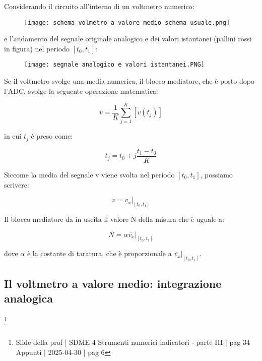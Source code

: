 Considerando il circuito all'interno di un voltmetro numerico: 

\begin{figure}[h]
    \centering
    \texttt{[image: schema volmetro a valore medio schema usuale.png]}
\end{figure} 

e l'andamento del segnale originale analogico e dei valori istantanei (pallini rossi in figura) nel periodo $[t_0, t_1]$: 

\begin{figure}[h]
    \centering
    \texttt{[image: segnale analogico e valori istantanei.PNG]}
\end{figure}

Se il voltmetro svolge una media numerica, il blocco mediatore, che è posto dopo l'ADC, 
svolge la seguente operazione matematica: 

{
    \Large 
    \begin{equation}
            \overline{v} = \frac{1}{K} \sum_{j = 1}^{K} \left[ v(t_j) \right]
    \end{equation}
}

in cui $t_j$ è preso come: 

{
    \Large 
    \begin{equation}
        t_j = t_0 + j \frac{t_1 - t_0}{K}
    \end{equation}
}

Siccome la media del segnale v viene svolta nel periodo $[t_0, t_1]$, 
possiamo scrivere: 

{
    \Large 
    \begin{equation}
        \overline{v} = \left. \overline{v_x} \right|_{[t_0, t_1]}
    \end{equation}
}

Il blocco mediatore da in uscita il valore N della misura che è uguale a: 

{
    \Large 
    \begin{equation}
        N = \alpha \left. \overline{v_x} \right|_{[t_0, t_1]}
    \end{equation}
}

dove $\alpha$ è la costante di taratura, 
che è proporzionale a $\left. \overline{v_x} \right|_{[t_0, t_1]}$. \newline 

\newpage 

\subsection{Il voltmetro a valore medio: integrazione analogica}
\footnote{Slide della prof | SDME 4 Strumenti numerici indicatori - parte III | pag  34\\  
Appunti | 2025-04-30 | pag 6}

